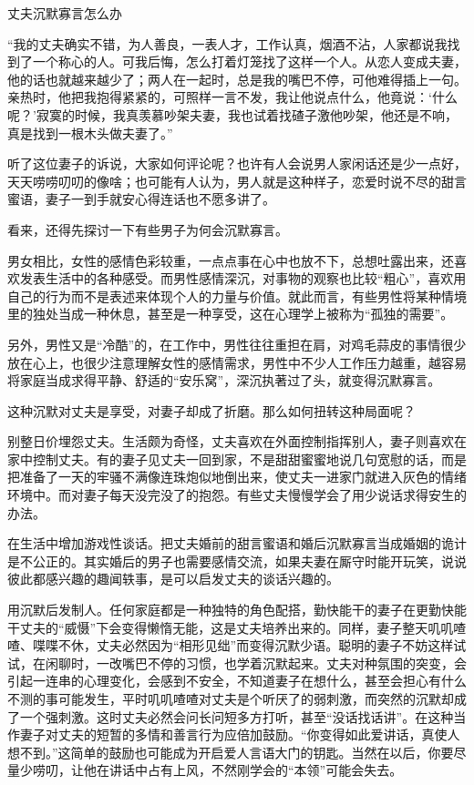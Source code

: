 \documentclass[12pt,UTF8,openany]{ctexbook}
\begin{document}
丈夫沉默寡言怎么办


“我的丈夫确实不错，为人善良，一表人才，工作认真，烟酒不沾，人家都说我找到了一个称心的人。可我后悔，怎么打着灯笼找了这样一个人。从恋人变成夫妻，他的话也就越来越少了；两人在一起时，总是我的嘴巴不停，可他难得插上一句。亲热时，他把我抱得紧紧的，可照样一言不发，我让他说点什么，他竟说：‘什么呢？’寂寞的时候，我真羡慕吵架夫妻，我也试着找碴子激他吵架，他还是不响，真是找到一根木头做夫妻了。”

听了这位妻子的诉说，大家如何评论呢？也许有人会说男人家闲话还是少一点好，天天唠唠叨叨的像啥；也可能有人认为，男人就是这种样子，恋爱时说不尽的甜言蜜语，妻子一到手就安心得连话也不愿多讲了。

看来，还得先探讨一下有些男子为何会沉默寡言。

男女相比，女性的感情色彩较重，一点点事在心中也放不下，总想吐露出来，还喜欢发表生活中的各种感受。而男性感情深沉，对事物的观察也比较“粗心”，喜欢用自己的行为而不是表述来体现个人的力量与价值。就此而言，有些男性将某种情境里的独处当成一种休息，甚至是一种享受，这在心理学上被称为“孤独的需要”。

另外，男性又是“冷酷”的，在工作中，男性往往重担在肩，对鸡毛蒜皮的事情很少放在心上，也很少注意理解女性的感情需求，男性中不少人工作压力越重，越容易将家庭当成求得平静、舒适的“安乐窝”，深沉执著过了头，就变得沉默寡言。

这种沉默对丈夫是享受，对妻子却成了折磨。那么如何扭转这种局面呢？

别整日价埋怨丈夫。生活颇为奇怪，丈夫喜欢在外面控制指挥别人，妻子则喜欢在家中控制丈夫。有的妻子见丈夫一回到家，不是甜甜蜜蜜地说几句宽慰的话，而是把准备了一天的牢骚不满像连珠炮似地倒出来，使丈夫一进家门就进入灰色的情绪环境中。而对妻子每天没完没了的抱怨。有些丈夫慢慢学会了用少说话求得安生的办法。

在生活中增加游戏性谈话。把丈夫婚前的甜言蜜语和婚后沉默寡言当成婚姻的诡计是不公正的。其实婚后的男子也需要感情交流，如果夫妻在厮守时能开玩笑，说说彼此都感兴趣的趣闻轶事，是可以启发丈夫的谈话兴趣的。

用沉默后发制人。任何家庭都是一种独特的角色配搭，勤快能干的妻子在更勤快能干丈夫的“威慑”下会变得懒惰无能，这是丈夫培养出来的。同样，妻子整天叽叽喳喳、喋喋不休，丈夫必然因为“相形见绌”而变得沉默少语。聪明的妻子不妨这样试试，在闲聊时，一改嘴巴不停的习惯，也学着沉默起来。丈夫对种氛围的突变，会引起一连串的心理变化，会感到不安全，不知道妻子在想什么，甚至会担心有什么不测的事可能发生，平时叽叽喳喳对丈夫是个听厌了的弱刺激，而突然的沉默却成了一个强刺激。这时丈夫必然会问长问短多方打听，甚至“没话找话讲”。在这种当作妻子对丈夫的短暂的多情和善言行为应倍加鼓励。“你变得如此爱讲话，真使人想不到。”这简单的鼓励也可能成为开启爱人言语大门的钥匙。当然在以后，你要尽量少唠叨，让他在讲话中占有上风，不然刚学会的“本领”可能会失去。
\end{document}
